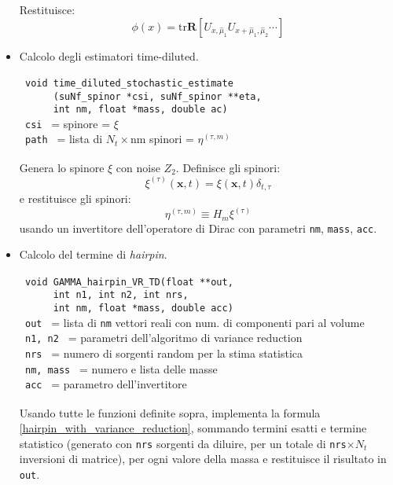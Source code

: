 \documentclass[a4paper]{article}
\newcommand{\tr}{\mathrm{tr}}
\begin{document}
\begin{itemize}
Restituisce:
$$
\phi(x) = \tr \mathbf{R} \left[ U_{x, \hat{\mu}_1} U_{x+\hat{\mu}_1, \hat{\mu}_2} \cdots \right]
$$

\item Calcolo degli estimatori time-diluted.\\
\verb| |\\
\verb| void time_diluted_stochastic_estimate|\\
\verb|      (suNf_spinor *csi, suNf_spinor **eta,|\\
\verb|      int nm, float *mass, double ac)|\\
\verb| csi | = spinore  = $\xi$\\
\verb| path | = lista di $N_t \times \textrm{nm}$ spinori = $\eta^{(\tau,m)}$ \\
\verb| |\\

Genera lo spinore $\xi$ con noise $Z_2$. Definisce gli spinori:
$$
\xi^{(\tau)}(\mathbf{x},t) = \xi(\mathbf{x},t) \delta_{t,\tau}
$$
e restituisce gli spinori:
$$
\eta^{(\tau,m)} \equiv H_m \xi^{(\tau)}
$$
usando un invertitore dell'operatore di Dirac con parametri \verb|nm|, \verb|mass|, \verb|acc|.

\item Calcolo del termine di \textit{hairpin}.\\
\verb| |\\
\verb| void GAMMA_hairpin_VR_TD(float **out,|\\
\verb|      int n1, int n2, int nrs,|\\
\verb|      int nm, float *mass, double acc)|\\
\verb| out | = lista di \verb|nm| vettori reali con num. di componenti pari al volume \\
\verb| n1, n2 | = parametri dell'algoritmo di variance reduction \\
\verb| nrs | = numero di sorgenti random per la stima statistica \\
\verb| nm, mass | = numero e lista delle masse \\
\verb| acc | = parametro dell'invertitore \\
\verb| |\\

Usando tutte le funzioni definite sopra, implementa la formula \ref{hairpin_with_variance_reduction}, sommando termini esatti e termine statistico (generato con \verb|nrs| sorgenti da diluire, per un totale di \verb|nrs|$\times N_t$ inversioni di matrice), per ogni valore della massa e restituisce il risultato in \verb|out|.

\end{itemize}
\end{document}
